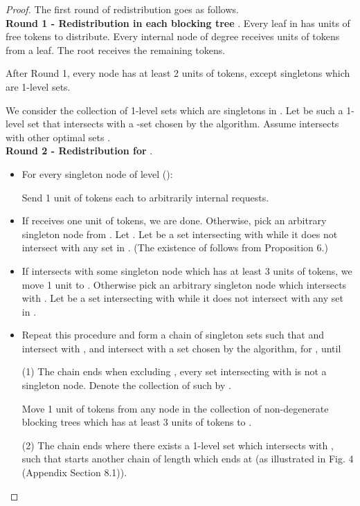 \documentclass[runningheads,a4paper]{llncs}
\numberwithin{equation}{section}
\begin{document}
\begin{proof}
The first round of redistribution goes as follows. \\

\textbf{Round 1 - Redistribution in each blocking tree }. Every leaf in  has  units of free tokens to distribute. Every internal node  of degree  receives  units of tokens from a leaf. The root receives the remaining tokens.

\begin{proposition}
After Round 1, every node has at least 2 units of tokens, except singletons which are 1-level sets.
\end{proposition}

We consider the collection of 1-level sets  which are singletons in . Let  be such a 1-level set that intersects with a -set  chosen by the algorithm. Assume  intersects with  other optimal sets . \\

\textbf{Round 2 - Redistribution for }.
    \begin{itemize}
    \item For every singleton node of level  ():

    Send 1 unit of tokens each to arbitrarily  internal requests.
    \item If  receives one unit of tokens, we are done. Otherwise, pick an arbitrary singleton node  from . Let . Let  be a set intersecting with  while it does not intersect with any set in . (The existence of  follows from Proposition 6.)
    \item If  intersects with some singleton node which has at least 3 units of tokens, we move 1 unit to . Otherwise pick an arbitrary singleton node  which intersects with . Let  be a set intersecting with  while it does not intersect with any set in .
    \item Repeat this procedure and form a chain of singleton sets  such that  and  intersect with ,  and  intersect with a set  chosen by the algorithm, for , until


        (1) The chain ends when excluding , every set intersecting with  is not a singleton node. Denote the collection of such  by .

        Move 1 unit of tokens from any node in the collection of non-degenerate blocking trees which has at least 3 units of tokens to .

        (2) The chain ends where there exists a 1-level set  which intersects with , such that  starts another chain of length  which ends at  (as illustrated in Fig. 4 (Appendix Section 8.1)).



\end{itemize}
\end{proof}
\end{document}
